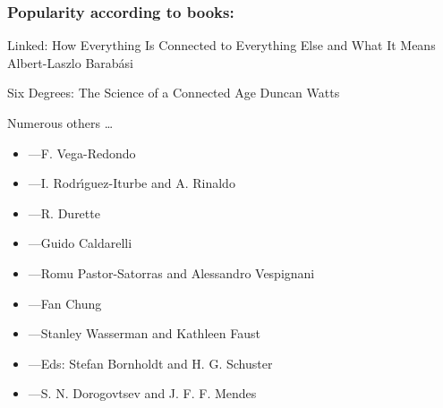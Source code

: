 \begin{frame}
  \frametitle{Popularity according to books:}

  {Linked: How Everything Is Connected to Everything Else and What It Means}
  {Albert-Laszlo Barab\'{a}si}

  \bigskip

  {Six Degrees: The Science of a Connected Age}
  {Duncan Watts\cite{watts2003a}}

\end{frame}


\begin{frame}
  
  \small

  \begin{block}{Numerous others \ldots}
      \begin{itemize}
    \item 
      ---F. Vega-Redondo\cite{vega-redondo2007a}
    \item 
      ---I. Rodr\'{\i}guez-Iturbe and A. Rinaldo\cite{rodriguez-iturbe1997a}
    \item 
      ---R. Durette
    \item 
      ---Guido Caldarelli
    \item 
      ---Romu Pastor-Satorras and Alessandro Vespignani
    \item 
      ---Fan Chung
    \item 
      ---Stanley Wasserman and Kathleen Faust
    \item 
      ---Eds: Stefan Bornholdt and H. G. Schuster\cite{bornholdt2003a}
    \item 
      ---S. N. Dorogovtsev and J. F. F. Mendes\cite{dorogovtsev2003a}
    \end{itemize}
  \end{block}

\end{frame}

